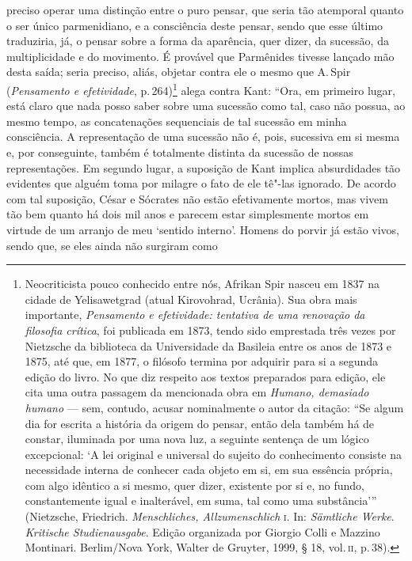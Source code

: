 preciso operar uma distinção entre o puro pensar, que seria tão atemporal
quanto o ser único parmenidiano, e a consciência deste pensar, sendo que esse
último traduziria, já, o pensar sobre a forma da aparência, quer dizer, da
sucessão, da multiplicidade e do movimento. É provável que Parmênides tivesse
lançado mão desta saída; seria preciso, aliás, objetar contra ele o mesmo que
A.\,Spir (\textit{Pensamento e efetividade}, p.\,264)\footnote{ Neocriticista
pouco conhecido entre nós, Afrikan Spir nasceu em 1837 na cidade de
Yelisawetgrad (atual Kirovohrad, Ucrânia). Sua obra mais importante, \textit{Pensamento 
e efetividade: tentativa de uma renovação da filosofia crítica},
foi publicada em 1873, tendo sido emprestada três vezes por Nietzsche da
biblioteca da Universidade da Basileia entre os anos de 1873 e 1875, até que,
em 1877, o filósofo termina por adquirir para si a segunda edição do livro.
No que diz respeito aos textos preparados para edição, ele cita uma outra
passagem da mencionada obra em \textit{Humano, demasiado humano} --- sem,
contudo, acusar nominalmente o autor da citação: ``Se algum dia for escrita a
história da origem do pensar, então dela também há de constar, iluminada por
uma nova luz, a seguinte sentença de um lógico excepcional: `A lei original e
universal do sujeito do conhecimento consiste na necessidade interna de
conhecer cada objeto em si, em sua essência própria, com algo idêntico a si
mesmo, quer dizer, existente por si e, no fundo, constantemente igual e
inalterável, em suma, tal como uma substância''' (Nietzsche, Friedrich.
\textit{Menschliches, Allzumenschlich} \textsc{i.} In:
\textit{Sämtliche Werke}. \textit{Kritische Studienausgabe}. Edição organizada
 por Giorgio Colli e Mazzino Montinari. Berlim/Nova York, Walter de Gruyter,
 1999, § 18, vol.\,\textsc{ii}, p.\,38).} alega contra Kant: ``Ora, em primeiro
 lugar, está claro que nada posso saber sobre uma sucessão como tal, caso não
 possua, ao mesmo tempo, as concatenações sequenciais de tal sucessão em
 minha consciência. A representação de uma sucessão não é, pois, sucessiva em
 si mesma e, por conseguinte, também é totalmente distinta da sucessão de
 nossas representações. Em segundo lugar, a suposição de Kant implica
 absurdidades tão evidentes que alguém toma por milagre o fato de ele tê"-las
 ignorado. De acordo com tal suposição, César e Sócrates não estão
 efetivamente mortos, mas vivem tão bem quanto há dois mil anos e parecem
 estar simplesmente mortos em virtude de um arranjo de meu `sentido interno'.
 Homens do porvir já estão vivos, sendo que, se eles ainda não surgiram como
